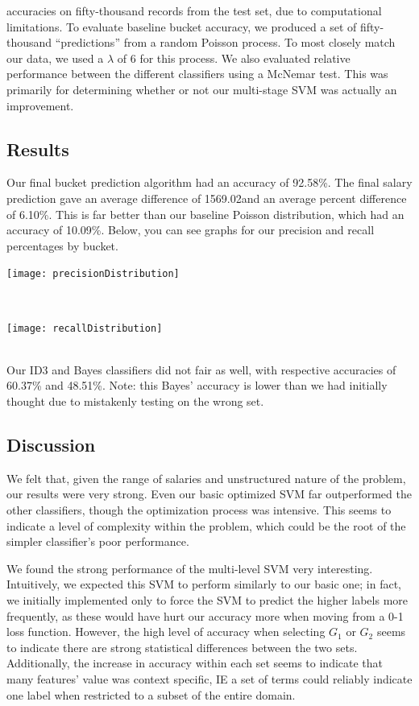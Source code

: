 \documentclass{pset}
\begin{document}
accuracies on fifty-thousand records from the test set, due to computational
limitations. To evaluate baseline bucket accuracy, we produced a set of
fifty-thousand ``predictions'' from a random Poisson process. To most closely
match our data, we used a $\lambda$ of 6 for this process. We also evaluated
relative performance between the different classifiers using a McNemar test.
This was primarily for determining whether or not our multi-stage SVM was
actually an improvement.

\subsection{Results} Our final bucket prediction algorithm had an accuracy of
92.58\%. The final salary prediction gave an average difference of
1569.02\textsterling and an average percent difference of 6.10\%. This is far
better than our baseline Poisson distribution, which had an accuracy of
10.09\%. Below, you can see graphs for our precision and recall percentages by
bucket.\\
\centerline{\texttt{[image: precisionDistribution]}}\\
\centerline{\texttt{[image: recallDistribution]}}\\
Our ID3 and Bayes classifiers did not fair as well, with respective accuracies of 60.37\% and 48.51\%. Note: this Bayes' accuracy is lower than we had initially thought due to mistakenly testing on the wrong set. 

\subsection{Discussion} We felt that, given the range of salaries and
unstructured nature of the problem, our results were very strong. Even our
basic optimized SVM far outperformed the other classifiers, though the
optimization process was intensive. This seems to indicate a level of
complexity within the problem, which could be the root of the simpler
classifier's poor performance. 

We found the strong performance of the multi-level SVM very interesting.
Intuitively, we expected this SVM to perform similarly to our basic one; in
fact, we initially implemented only to force the SVM to predict the higher
labels more frequently, as these would have hurt our accuracy more when moving
from a 0-1 loss function. However, the high level of accuracy when selecting
$G_1$ or $G_2$ seems to indicate there are strong statistical differences
between the two sets. Additionally, the increase in accuracy within each set
seems to indicate that many features' value was context specific, IE a set of
terms could reliably indicate one label when restricted to a subset of the
entire domain. 
\end{document}
